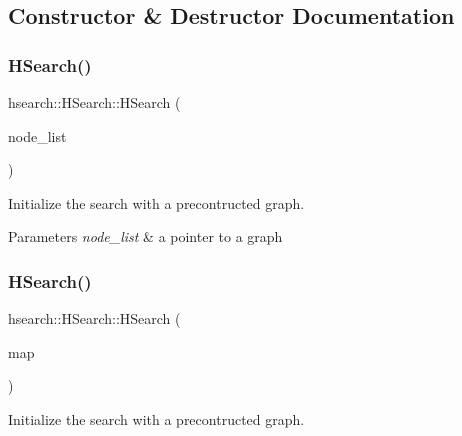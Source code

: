 \subsection{Constructor \& Destructor Documentation}
\mbox{\label{classhsearch_1_1HSearch_a52aed9d8d8c634bd506cfd3c14620884}} 
\subsubsection{\texorpdfstring{H\+Search()}{HSearch()}\hspace{0.1cm}{\footnotesize\ttfamily [1/2]}}
{\footnotesize\ttfamily hsearch\+::\+H\+Search\+::\+H\+Search (\begin{DoxyParamCaption}\item[{std\+::vector$<$ \hyperlink{structprm_1_1Node}{prm\+::\+Node} $>$ $\ast$}]{node\+\_\+list }\end{DoxyParamCaption})}



Initialize the search with a precontructed graph. 


\begin{DoxyParams}{Parameters}
{\em node\+\_\+list} & a pointer to a graph \\
\hline
\end{DoxyParams}
\mbox{\label{classhsearch_1_1HSearch_a58bce8362211fa679ebf8200dc31d03d}} 
\subsubsection{\texorpdfstring{H\+Search()}{HSearch()}\hspace{0.1cm}{\footnotesize\ttfamily [2/2]}}
{\footnotesize\ttfamily hsearch\+::\+H\+Search\+::\+H\+Search (\begin{DoxyParamCaption}\item[{\hyperlink{structgrid_1_1Map}{grid\+::\+Map}}]{map }\end{DoxyParamCaption})}



Initialize the search with a precontructed graph. 


